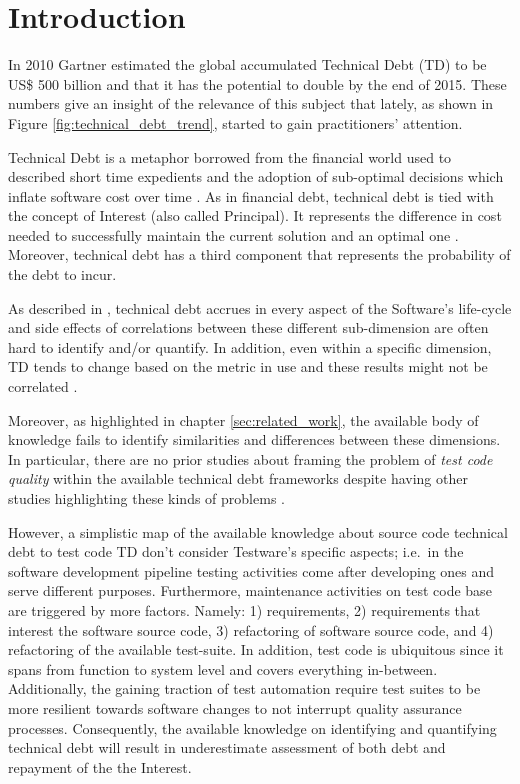 
\chapter{Introduction} \label{sec:introduction}

In 2010 Gartner estimated the global accumulated Technical Debt (TD) to be US\$ 500 billion \cite{costOfTechnicalDebt} and that it has the potential to double by the end of 2015. These numbers give an insight of the relevance of this subject that lately, as shown in Figure \ref{fig:technical_debt_trend}, started to gain practitioners' attention.

Technical Debt is a metaphor borrowed from the financial world used to described short time expedients and the adoption of sub-optimal decisions which inflate software cost over time \cite{first_mention_of_TD}. As in financial debt, technical debt is tied with the concept of Interest (also called Principal). It represents the difference in cost needed to successfully maintain the current solution and an optimal one \cite{technicalDebtInterest}. Moreover, technical debt has a third component that represents the probability of the debt to incur.

As described in \cite{mapping_study_td, exploration_of_td, exploration_of_td2}, technical debt accrues in every aspect of the Software's life-cycle and side effects of correlations between these different sub-dimension are often hard to identify and/or quantify. In addition, even within a specific dimension, TD tends to change based on the metric in use and these results might not be correlated \cite{4_methods_to_identify_td}.

Moreover, as highlighted in chapter \ref{sec:related_work}, the available body of knowledge fails to identify similarities and differences between these dimensions. In particular, there are no prior studies about framing the problem of \textit{test code quality} within the available technical debt frameworks despite having other studies highlighting these kinds of problems \cite{gui_scripts_bad_smells,pitfalls_in_introducing_regression_testing}.

However, a simplistic map of the available knowledge about source code technical debt to test code TD don't consider Testware's specific aspects; i.e.\ in the software development pipeline testing activities come after developing ones and serve different purposes. Furthermore, maintenance activities on test code base are triggered by more factors. Namely: 1) requirements, 2) requirements that interest the software source code, 3) refactoring of software source code, and 4) refactoring of the available test-suite. In addition, test code is ubiquitous since it spans from function to system level and covers everything in-between. Additionally, the gaining traction of test automation require test suites to be more resilient towards software changes to not interrupt quality assurance processes. Consequently, the available knowledge on identifying and quantifying technical debt will result in underestimate assessment of both debt and repayment of the the Interest.

